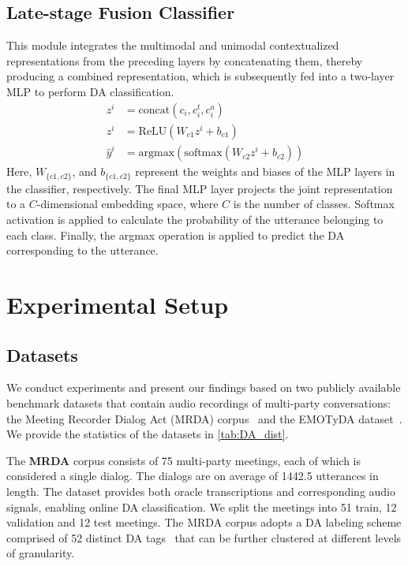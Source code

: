 \subsection{Late-stage Fusion Classifier}

This module integrates the multimodal and unimodal contextualized representations from the preceding layers by concatenating them, thereby producing a combined representation, which is subsequently fed into a two-layer MLP to perform DA classification. 
%
\begin{align}
z^{i} &= \text{concat}(c_{i}, c_{i}^{t}, c_{i}^{a})\\
z^{i} &= \text{ReLU}(W_{c1} z^{i} + b_{c1})\\
\hat{y}^{i} &= \text{argmax}(\text{softmax}(W_{c2} z^{i} + b_{c2}))
\end{align}
%
Here, $W_{\{c1, c2\}}$, and $b_{\{c1, c2\}}$ represent the weights and biases of the MLP layers in the classifier, respectively.
The final MLP layer projects the joint representation to a $C$-dimensional embedding space, where $C$ is the number of classes.
Softmax activation is applied to calculate the probability of the utterance belonging to each class.
Finally, the argmax operation is applied to predict the DA corresponding to the utterance.

\section{Experimental Setup}

\subsection{Datasets}

We conduct experiments and present our findings based on two publicly available benchmark datasets that contain audio recordings of multi-party conversations: the Meeting Recorder Dialog Act (MRDA) corpus~\cite{shriberg-etal-2004-icsi} and the EMOTyDA dataset~\cite{saha-etal-2020-towards}. We provide the statistics of the datasets in \autoref{tab:DA_dist}.


The \textbf{MRDA} corpus consists of 75 multi-party meetings, each of which is considered a single dialog. The dialogs are on average of 1442.5 utterances in length.
The dataset provides both oracle transcriptions and corresponding audio signals, enabling online DA classification.
We split the meetings into 51 train, 12 validation and 12 test meetings.
The MRDA corpus adopts a DA labeling scheme comprised of 52 distinct DA tags~\cite{Dhillon2004MeetingRP} that can be further clustered at different levels of granularity.

